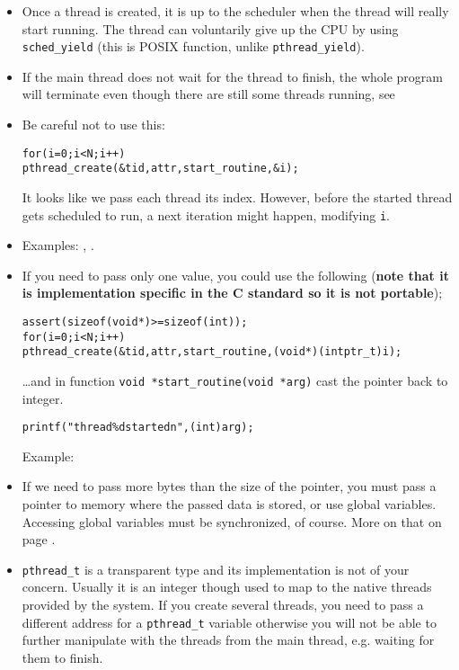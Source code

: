 \begin{itemize}
\item Once a thread is created, it is up to the scheduler when the thread
will really start running. The thread can voluntarily give up the CPU by using
\texttt{sched\_yield} (this is POSIX function, unlike \texttt{pthread\_yield}).
\item If the main thread does not wait for the thread to finish, the whole
program will terminate even though there are still some threads running,
see 
\item Be careful not to use this:
\begin{alltt}
for (i = 0; i < N; i++)
    pthread\_create(&tid, attr, start\_routine, &i);
\end{alltt}

It looks like we pass each thread its index.  However, before the started thread
gets scheduled to run, a next iteration might happen, modifying \texttt{i}.
\item {} Examples: ,
.
\item If you need to pass only one value, you could use the following
(\textbf{note that it is implementation specific in the C standard so it is not
portable});

\begin{alltt}
assert(sizeof (void *) >= sizeof (int));
for (i = 0; i < N; i++)
    pthread\_create(&tid, attr, start\_routine, (void *)(intptr\_t)i);
\end{alltt}

\dots and in function \texttt{void *start\_routine(void *arg)} cast the pointer
back to integer.

\begin{alltt}
printf("thread \%d started\bs{}n", (int)arg);
\end{alltt}

 Example: 
\item If we need to pass more bytes than the size of the pointer, you must
pass a pointer to memory where the passed data is stored, or use global
variables.  Accessing global variables must be synchronized, of course.  More on
that on page \pageref{THREADSYNCHRONIZATION}.
\item {} \texttt{pthread\_t} is a transparent type and
its implementation is not of your concern.  Usually it is an integer though used
to map to the native threads provided by the system.  If you create several
threads, you need to pass a different address for a \texttt{pthread\_t} variable
otherwise you will not be able to further manipulate with the threads from the
main thread, e.g. waiting for them to finish.
\end{itemize}

